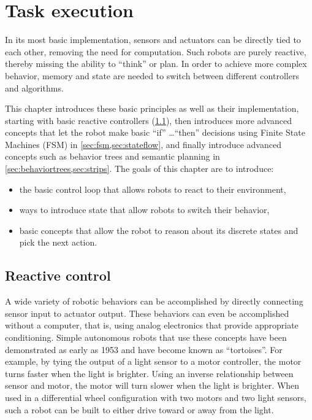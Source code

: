 \chapter{Task execution}\label{chap:taskexecution}

In its most basic implementation, sensors and actuators can be directly tied to each other, removing the need for computation. Such robots are purely reactive, thereby missing the ability to ``think'' or plan. In order to achieve more complex behavior, memory and state are needed to switch between different controllers and algorithms.

This chapter introduces these basic principles as well as their implementation, starting with basic reactive controllers (\cref{sec:braitenberg}), then introduces more advanced concepts that let the robot make basic ``if'' \ldots ``then'' decisions using Finite State Machines (FSM) in \cref{sec:fsm,sec:stateflow}, and finally introduce advanced concepts such as behavior trees and semantic planning in \cref{sec:behaviortrees,sec:strips}.
The goals of this chapter are to introduce:

\begin{itemize}
    \item the basic control loop that allows robots to react to their environment, 
    \item ways to introduce state that allow robots to switch their behavior, 
    \item basic concepts that allow the robot to reason about its discrete states and pick the next action. 
\end{itemize}

\section{Reactive control}\label{sec:braitenberg}

A wide variety of robotic behaviors can be accomplished by directly connecting sensor input to actuator output. These behaviors can even be accomplished without a computer, that is, using analog electronics that provide appropriate conditioning.
Simple autonomous robots that use these concepts have been demonstrated as early as 1953 \cite{walter1953living} and have become known as ``tortoises''. For example, by tying the output of a light sensor to a motor controller, the motor turns faster when the light is brighter. Using an inverse relationship between sensor and motor, the motor will turn slower when the light is brighter. When used in a differential wheel configuration with two motors and two light sensors, such a robot can be built to either drive toward or away from the light.


